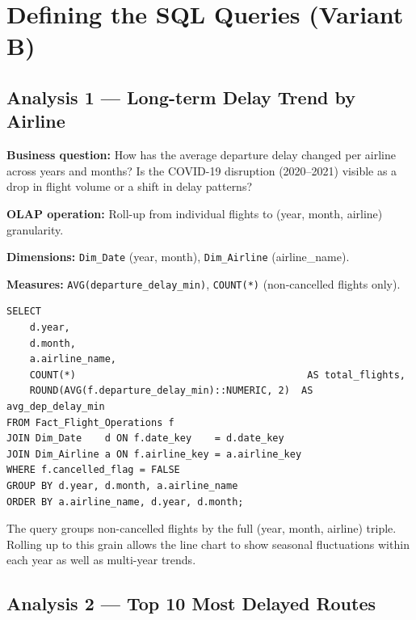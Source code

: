 \documentclass[12pt,a4paper]{article}
\begin{document}
\section{Defining the SQL Queries (Variant B)}

\subsection{Analysis 1 — Long-term Delay Trend by Airline}

\textbf{Business question:} How has the average departure delay changed per
airline across years and months? Is the COVID-19 disruption (2020–2021)
visible as a drop in flight volume or a shift in delay patterns?

\textbf{OLAP operation:} Roll-up from individual flights to
(year, month, airline) granularity.

\textbf{Dimensions:} \texttt{Dim\_Date} (year, month),
\texttt{Dim\_Airline} (airline\_name).

\textbf{Measures:} \texttt{AVG(departure\_delay\_min)},
\texttt{COUNT(*)} (non-cancelled flights only).

\begin{lstlisting}[style=sql]
SELECT
    d.year,
    d.month,
    a.airline_name,
    COUNT(*)                                        AS total_flights,
    ROUND(AVG(f.departure_delay_min)::NUMERIC, 2)  AS avg_dep_delay_min
FROM Fact_Flight_Operations f
JOIN Dim_Date    d ON f.date_key    = d.date_key
JOIN Dim_Airline a ON f.airline_key = a.airline_key
WHERE f.cancelled_flag = FALSE
GROUP BY d.year, d.month, a.airline_name
ORDER BY a.airline_name, d.year, d.month;
\end{lstlisting}

The query groups non-cancelled flights by the full (year, month, airline)
triple. Rolling up to this grain allows the line chart to show seasonal
fluctuations within each year as well as multi-year trends.

\subsection{Analysis 2 — Top 10 Most Delayed Routes}
\end{document}
